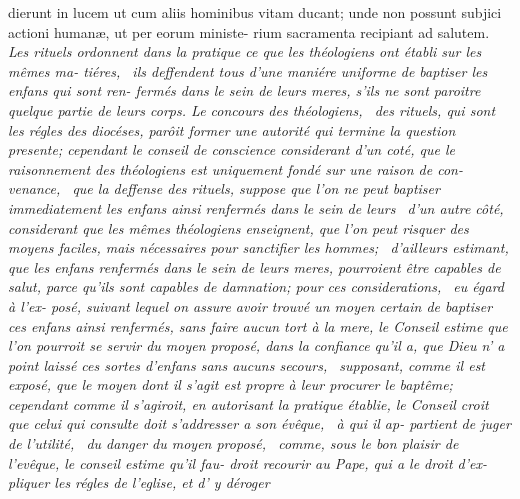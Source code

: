 \documentclass[twoside]{article}
\begin{document}
\newpage
\bgroup\fontsize{9.6}{14}\selectfont\noindent
dierunt in lucem ut cum aliis hominibus\break
vitam ducant; unde non possunt subjici\break
actioni humanæ, ut per eorum ministe-\break
rium sacramenta recipiant ad salutem.\break
\itshape 
Les rituels ordonnent dans la pratique ce que\break
les théologiens ont établi sur les mêmes ma-\break
tiéres, \et\ ils deffendent tous d’une maniére\break
uniforme de baptiser les enfans qui sont ren-\break
fermés dans le sein de leurs meres, s’ils ne\break
sont paroitre quelque partie de leurs corps.\break 
Le concours des théologiens, \et\ des rituels,\break
qui sont les régles des diocéses, parôit former\break
une autorité qui termine la question presente\textnormal{;}\break
cependant le conseil de conscience considerant\break
d’un coté, que le raisonnement des théologiens\break
est uniquement fondé sur une raison de con-\break
venance, \et\ que la deffense des rituels, suppose\break
que l’on ne peut baptiser immediatement les\break
enfans ainsi renfermés dans le sein de leurs\break
{}\break
\et\ d’un autre côté, considerant que les mêmes
théologiens enseignent, que l’on peut risquer\break
{}\break
des moyens faciles, mais nécessaires pour\break 
sanctifier les hommes\textnormal{;} \et\ d’ailleurs estimant,\break
que les enfans renfermés dans le sein de leurs\break
meres, pourroient être capables de salut,\break
parce qu’ils sont capables de damnation\textnormal{;}\tsk\break 
pour ces considerations, \et\ eu égard à l’ex-\break
posé, suivant lequel on assure avoir trouvé\break
un moyen certain de baptiser ces enfans ainsi\break
renfermés, sans faire aucun tort à la mere,\break
le Conseil estime que l’on pourroit se servir du\break
moyen proposé, dans la confiance qu’il a, que\break
Dieu n’ a point laissé ces sortes d’enfans\break
sans aucuns secours, \et\ supposant, comme\break
il est exposé, que le moyen dont il s’agit est\break
propre à leur procurer le baptême\textnormal{;} cependant\break
comme il s’agiroit, en autorisant la pratique\break
{}\break
établie, le Conseil croit que celui qui consulte\break
doit s’addresser a son évêque, \et\ à qui il ap-
partient de juger de l’utilité, \et\ du danger\break
du moyen proposé, \et\ comme, sous le bon\break
plaisir de l’evêque, le conseil estime qu’il fau-\break
droit recourir au Pape, qui a le droit d’ex-\break
pliquer les régles de l’eglise, et d’ y déroger\break
\end{document}
